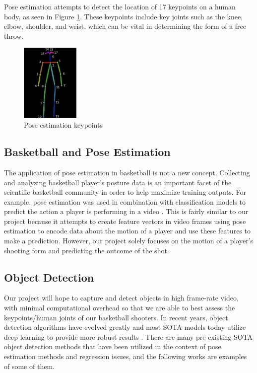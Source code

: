 \documentclass[10pt,twocolumn,letterpaper]{article}
\begin{document}
Pose estimation attempts to detect the location of 17 keypoints on a human body, as seen in Figure \ref{fig:pose}. These keypoints include key joints such as
the knee, elbow, shoulder, and wrist, which can be vital in determining the form of a free throw.
\begin{figure}[h]
  \centering
  \includegraphics[width=0.25\textwidth]{imgs/openpose.png}
  \caption{Pose estimation keypoints}
  \label{fig:pose}
\end{figure}
%
 
\subsection{Basketball and Pose Estimation}

The application of pose estimation in basketball is not a new concept. Collecting and analyzing basketball player's
posture data is an important facet of the scientific basketball community in order to help maximize training outputs.
For example, pose estimation was used in combination with classification models to predict the action a player is performing
in a video \cite{Basketball}. This is fairly similar to our project because it attempts to create feature vectors in video frames
using pose estimation to encode data about the motion of a player and use these features to make a prediction. However, our project
solely focuses on the motion of a player's shooting form and predicting the outcome of the shot.

%

\subsection{Object Detection}

Our project will hope to capture and detect objects in high frame-rate video, with minimal computational overhead so that we are able to best assess the keypoints/human joints of our basketball shooters. 
In recent years, object detection algorithms have evolved greatly and most SOTA models today utilize deep learning to provide more robust results \cite{Viso}. There are many pre-existing SOTA object detection methods that have been utilized in the context of pose estimation methods and regression issues, and the following works are examples of some of them.
\end{document}
